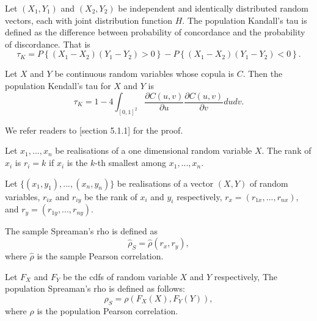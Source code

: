 \begin{defi}
  Let $(X_1, Y_1)$ and $(X_2, Y_2)$ be independent and identically distributed random vectors, each with joint distribution function $H$.
  The population Kandall's tau is defined as the difference between probability of concordance and the probability of discordance. 
  That is  
  \begin{equation*}
  \tau_K = P\left\{(X_1- X_2)(Y_1-Y_2) >0\right\} - P\left\{(X_1- X_2)(Y_1-Y_2) < 0\right\}. 
  \end{equation*}
  \end{defi}

\begin{prop}
  Let $X$ and $Y$ be continuous random variables whose copula is $C$. 
  Then the population Kendall's tau for $X$ and $Y$ is 
  \[\tau_K = 1-4\int_{[0,1]^2}
  \frac{\partial C(u,v)}{\partial u}
  \frac{\partial C(u,v)}{\partial v}
  dudv. \]
\end{prop}

We refer readers to \cite{Nelsen1999}[section 5.1.1] for the proof. 

\begin{defi}[Rank]
  Let $x_1,...,x_n$ be realisations of a one dimensional random variable $X$. 
  The rank of $x_i$ is $r_i = k$ if $x_i$ is the $k$-th smallest among $x_1,...,x_n$.
  \end{defi}

\begin{defi}
  Let $\{(x_1, y_1),..., (x_n, y_n)\}$ be realisations of a vector $(X, Y)$ of random variables,
  $r_{ix}$ and $r_{iy}$ be the rank of $x_i$ and $y_i$ respectively, 
  $r_x = (r_{1x},..., r_{nx})$, and $r_y = (r_{1y},..., r_{ny})$. 

  The sample Spreaman's rho is defined as
  \begin{equation*}
  \hat \rho_S = \hat \rho(r_x, r_y), 
  \end{equation*}
  where $\hat \rho$ is the sample Pearson correlation.
  \end{defi}

\begin{defi}
  Let $F_X$ and $F_Y$ be the cdfs of random variable $X$ and $Y$ respectively, 
  The population Spreaman's rho is defined as follows:
  \begin{equation*}
  \rho_S = \rho(F_X(X), F_Y(Y)),  
  \end{equation*}
  where $\rho$ is the population Pearson correlation. 
  \end{defi}


